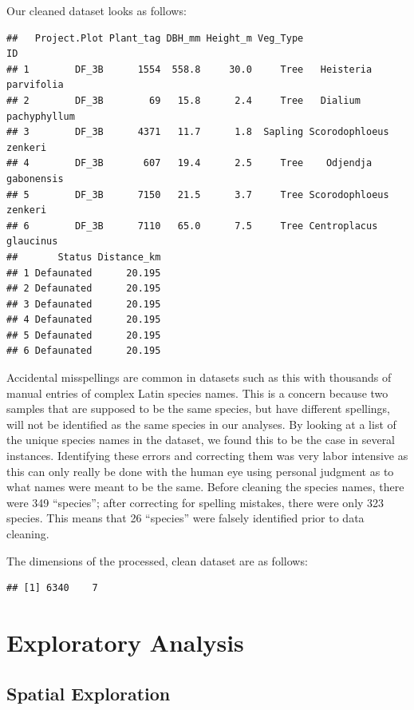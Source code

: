 \documentclass[
  12pt,
]{article}
\begin{document}
Our cleaned dataset looks as follows:

\begin{verbatim}
##   Project.Plot Plant_tag DBH_mm Height_m Veg_Type                     ID
## 1        DF_3B      1554  558.8     30.0     Tree   Heisteria parvifolia
## 2        DF_3B        69   15.8      2.4     Tree   Dialium pachyphyllum
## 3        DF_3B      4371   11.7      1.8  Sapling Scorodophloeus zenkeri
## 4        DF_3B       607   19.4      2.5     Tree    Odjendja gabonensis
## 5        DF_3B      7150   21.5      3.7     Tree Scorodophloeus zenkeri
## 6        DF_3B      7110   65.0      7.5     Tree Centroplacus glaucinus
##       Status Distance_km
## 1 Defaunated      20.195
## 2 Defaunated      20.195
## 3 Defaunated      20.195
## 4 Defaunated      20.195
## 5 Defaunated      20.195
## 6 Defaunated      20.195
\end{verbatim}

Accidental misspellings are common in datasets such as this with
thousands of manual entries of complex Latin species names. This is a
concern because two samples that are supposed to be the same species,
but have different spellings, will not be identified as the same species
in our analyses. By looking at a list of the unique species names in the
dataset, we found this to be the case in several instances. Identifying
these errors and correcting them was very labor intensive as this can
only really be done with the human eye using personal judgment as to
what names were meant to be the same. Before cleaning the species names,
there were 349 ``species''; after correcting for spelling mistakes,
there were only 323 species. This means that 26 ``species'' were falsely
identified prior to data cleaning.

The dimensions of the processed, clean dataset are as follows:

\begin{verbatim}
## [1] 6340    7
\end{verbatim}

\newpage

\hypertarget{exploratory-analysis}{%
\section{Exploratory Analysis}\label{exploratory-analysis}}

\newpage

\hypertarget{spatial-exploration}{%
\subsection{Spatial Exploration}\label{spatial-exploration}}
\end{document}

